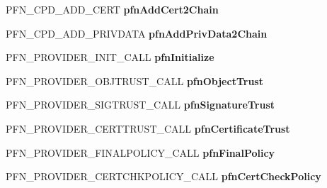 \begin{DoxyCompactItemize}
P\+F\+N\+\_\+\+C\+P\+D\+\_\+\+A\+D\+D\+\_\+\+C\+E\+RT {\bfseries pfn\+Add\+Cert2\+Chain}
\item 
\mbox{\label{struct___c_r_y_p_t___p_r_o_v_i_d_e_r___f_u_n_c_t_i_o_n_s_a3843c393defd0cd2ef99a91997d21b7c}} 
P\+F\+N\+\_\+\+C\+P\+D\+\_\+\+A\+D\+D\+\_\+\+P\+R\+I\+V\+D\+A\+TA {\bfseries pfn\+Add\+Priv\+Data2\+Chain}
\item 
\mbox{\label{struct___c_r_y_p_t___p_r_o_v_i_d_e_r___f_u_n_c_t_i_o_n_s_a8c97a0cb8d115a9c445491b190e975a3}} 
P\+F\+N\+\_\+\+P\+R\+O\+V\+I\+D\+E\+R\+\_\+\+I\+N\+I\+T\+\_\+\+C\+A\+LL {\bfseries pfn\+Initialize}
\item 
\mbox{\label{struct___c_r_y_p_t___p_r_o_v_i_d_e_r___f_u_n_c_t_i_o_n_s_a1cea1d606acea83c4d59cc4def923d9d}} 
P\+F\+N\+\_\+\+P\+R\+O\+V\+I\+D\+E\+R\+\_\+\+O\+B\+J\+T\+R\+U\+S\+T\+\_\+\+C\+A\+LL {\bfseries pfn\+Object\+Trust}
\item 
\mbox{\label{struct___c_r_y_p_t___p_r_o_v_i_d_e_r___f_u_n_c_t_i_o_n_s_a292d410fee597fa99d7671cdf5529da8}} 
P\+F\+N\+\_\+\+P\+R\+O\+V\+I\+D\+E\+R\+\_\+\+S\+I\+G\+T\+R\+U\+S\+T\+\_\+\+C\+A\+LL {\bfseries pfn\+Signature\+Trust}
\item 
\mbox{\label{struct___c_r_y_p_t___p_r_o_v_i_d_e_r___f_u_n_c_t_i_o_n_s_a1af2aee554e428efc8f7827c3c7ab32f}} 
P\+F\+N\+\_\+\+P\+R\+O\+V\+I\+D\+E\+R\+\_\+\+C\+E\+R\+T\+T\+R\+U\+S\+T\+\_\+\+C\+A\+LL {\bfseries pfn\+Certificate\+Trust}
\item 
\mbox{\label{struct___c_r_y_p_t___p_r_o_v_i_d_e_r___f_u_n_c_t_i_o_n_s_a4144a93f2ab61b216eab7d2387be9887}} 
P\+F\+N\+\_\+\+P\+R\+O\+V\+I\+D\+E\+R\+\_\+\+F\+I\+N\+A\+L\+P\+O\+L\+I\+C\+Y\+\_\+\+C\+A\+LL {\bfseries pfn\+Final\+Policy}
\item 
\mbox{\label{struct___c_r_y_p_t___p_r_o_v_i_d_e_r___f_u_n_c_t_i_o_n_s_ac644810f406ce31bec6fbcaae03d2091}} 
P\+F\+N\+\_\+\+P\+R\+O\+V\+I\+D\+E\+R\+\_\+\+C\+E\+R\+T\+C\+H\+K\+P\+O\+L\+I\+C\+Y\+\_\+\+C\+A\+LL {\bfseries pfn\+Cert\+Check\+Policy}

\end{DoxyCompactItemize}
